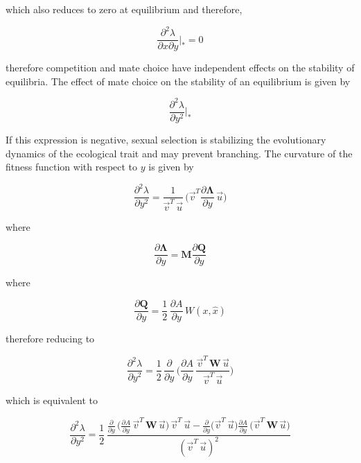 which also reduces to zero at equilibrium and therefore, 

\begin{equation}
    \frac{\partial^2 \lambda}{\partial x \partial y}\bigg|_* = 0
\end{equation}

therefore competition and mate choice  have independent effects on the stability of equilibria. The effect of mate choice on the stability of an equilibrium is given by

\begin{equation}
    \frac{\partial^2 \lambda}{\partial y^2}\bigg|_*
\end{equation}

If this expression is negative, sexual selection is stabilizing the evolutionary dynamics of the ecological trait and may prevent branching. The curvature of the fitness function with respect to $y$ is given by

\begin{equation}
    \frac{\partial^2 \lambda}{\partial y^2} = \frac{1}{\overrightarrow{v}^T\,\overrightarrow{u}}\,\bigg(\overrightarrow{v}^T\frac{\partial \pmb \Lambda}{\partial y}\,\overrightarrow{u}\bigg)
\end{equation}

where 

\begin{equation}
    \frac{\partial \pmb \Lambda}{\partial y} = \pmb M \frac{\partial \pmb Q}{\partial y}
\end{equation}

where

\begin{equation}
    \frac{\partial \pmb Q}{\partial y} = \frac{1}{2}\,\frac{\partial A}{\partial y}\,W(x,\hat x)
\end{equation}

therefore reducing to

\begin{equation}
    \frac{\partial^2 \lambda}{\partial y^2} = \frac{1}{2}\,\frac{\partial}{\partial y}\,\bigg(\frac{\partial A}{\partial y}\, \frac{\overrightarrow{v}^T\,\pmb W\,\overrightarrow{u}}{\overrightarrow{v}^T\,\overrightarrow{u}}\bigg)
\end{equation}

which is equivalent to

\begin{equation}
    \frac{\partial^2 \lambda}{\partial y^2} = \frac{1}{2}\,\frac{\frac{\partial}{\partial y}\,\Big(\frac{\partial A}{\partial y}\,\overrightarrow{v}^T\,\pmb W\,\overrightarrow{u}\Big)\,\overrightarrow{v}^T\,\overrightarrow{u}-\frac{\partial}{\partial y}\Big(\overrightarrow{v}^T\,\overrightarrow{u}\Big)\frac{\partial A}{\partial y}\,\Big(\overrightarrow{v}^T\,\pmb W\,\overrightarrow{u}\Big)}{(\overrightarrow{v}^T\,\overrightarrow{u})^2}
\end{equation}

